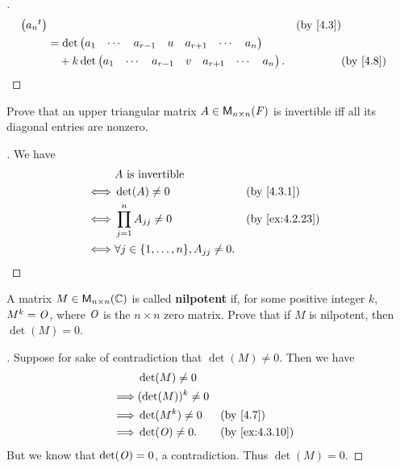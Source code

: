 \begin{proof}[]
\begin{align*}
\begin{pmatrix}
			                                      \tp{a_n}
		                                      \end{pmatrix}                         &  & \by{4.3} \\
		        & = \det\begin{pmatrix}
			                a_1 & \cdots & a_{r - 1} & u & a_{r + 1} & \cdots & a_n
		                \end{pmatrix}                   \\
		        & \quad + k \det\begin{pmatrix}
			                        a_1 & \cdots & a_{r - 1} & v & a_{r + 1} & \cdots & a_n
		                        \end{pmatrix}.      &  & \by{4.8}
	\end{align*}
\end{proof}

\begin{ex}\label{ex:4.3.9}
	Prove that an upper triangular matrix \(A \in \mathsf{M}_{{n} \times n}({\mathit{F}})\) is invertible iff all its diagonal entries are nonzero.
\end{ex}

\begin{proof}[]
	We have
	\begin{align*}
		     & A \text{ is invertible}                                              \\
		\iff & \det(A) \neq 0                                   &  & \by{4.3.1}     \\
		\iff & \prod_{j = 1}^n A_{j j} \neq 0                   &  & \by{ex:4.2.23} \\
		\iff & \forall j \in \set{1, \dots, n}, A_{j j} \neq 0.
	\end{align*}
\end{proof}

\begin{ex}\label{ex:4.3.10}
	A matrix \(M \in \mathsf{M}_{{n} \times n}({\mathbb{C}})\) is called \textbf{nilpotent} if, for some positive integer \(k\), \(M^k = \mathit{O}\), where \(\mathit{O}\) is the \(n \times n\) zero matrix.
	Prove that if \(M\) is nilpotent, then \(\det(M) = 0\).
\end{ex}

\begin{proof}[]
	Suppose for sake of contradiction that \(\det(M) \neq 0\).
	Then we have
	\begin{align*}
		         & \det(M) \neq 0                         \\
		\implies & (\det(M))^k \neq 0                     \\
		\implies & \det(M^k) \neq 0   &  & \by{4.7}       \\
		\implies & \det(\zm) \neq 0.  &  & \by{ex:4.3.10}
	\end{align*}
	But we know that \(\det(\mathit{O}) = 0\), a contradiction.
	Thus \(\det(M) = 0\).
\end{proof}


